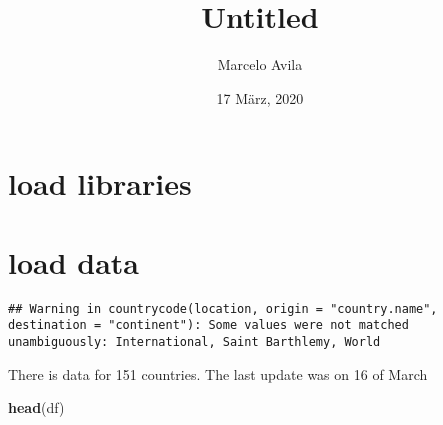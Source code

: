 \documentclass[]{article}
\title{Untitled}
\author{Marcelo Avila}
\date{17 März, 2020}
\newenvironment{Shaded}{\begin{snugshade}}{\end{snugshade}}
\newcommand{\DataTypeTok}[1]{\textcolor[rgb]{0.13,0.29,0.53}{#1}}
\newcommand{\KeywordTok}[1]{\textcolor[rgb]{0.13,0.29,0.53}{\textbf{#1}}}
\newcommand{\NormalTok}[1]{#1}
\newcommand{\OperatorTok}[1]{\textcolor[rgb]{0.81,0.36,0.00}{\textbf{#1}}}
\newcommand{\StringTok}[1]{\textcolor[rgb]{0.31,0.60,0.02}{#1}}
\begin{document}
\maketitle

\hypertarget{load-libraries}{%
\section{load libraries}\label{load-libraries}}

\hypertarget{load-data}{%
\section{load data}\label{load-data}}

\begin{Shaded}
\end{Shaded}

\begin{verbatim}
## Warning in countrycode(location, origin = "country.name", destination = "continent"): Some values were not matched unambiguously: International, Saint Barthlemy, World
\end{verbatim}

There is data for 151 countries. The last update was on 16 of March

\begin{Shaded}
\begin{Highlighting}[]
\KeywordTok{head}\NormalTok{(df)}
\end{Highlighting}
\end{Shaded}
\end{document}
